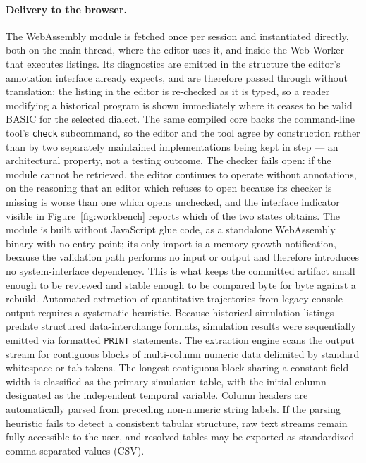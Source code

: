 \documentclass[11pt,a4paper]{article}
\begin{document}

\paragraph{Delivery to the browser.} The WebAssembly module is fetched once per session and instantiated directly, both on the main thread, where the editor uses it, and inside the Web Worker that executes listings. Its diagnostics are emitted in the structure the editor's annotation interface already expects, and are therefore passed through without translation; the listing in the editor is re-checked as it is typed, so a reader modifying a historical program is shown immediately where it ceases to be valid BASIC for the selected dialect. The same compiled core backs the command-line tool's \texttt{check} subcommand, so the editor and the tool agree by construction rather than by two separately maintained implementations being kept in step --- an architectural property, not a testing outcome. The checker fails open: if the module cannot be retrieved, the editor continues to operate without annotations, on the reasoning that an editor which refuses to open because its checker is missing is worse than one which opens unchecked, and the interface indicator visible in Figure~\ref{fig:workbench} reports which of the two states obtains. The module is built without JavaScript glue code, as a standalone WebAssembly binary with no entry point; its only import is a memory-growth notification, because the validation path performs no input or output and therefore introduces no system-interface dependency. This is what keeps the committed artifact small enough to be reviewed and stable enough to be compared byte for byte against a rebuild.
Automated extraction of quantitative trajectories from legacy console output requires a systematic heuristic. Because historical simulation listings predate structured data-interchange formats, simulation results were sequentially emitted via formatted \texttt{PRINT} statements. The extraction engine scans the output stream for contiguous blocks of multi-column numeric data delimited by standard whitespace or tab tokens. The longest contiguous block sharing a constant field width is classified as the primary simulation table, with the initial column designated as the independent temporal variable. Column headers are automatically parsed from preceding non-numeric string labels. If the parsing heuristic fails to detect a consistent tabular structure, raw text streams remain fully accessible to the user, and resolved tables may be exported as standardized comma-separated values (CSV).
\end{document}
